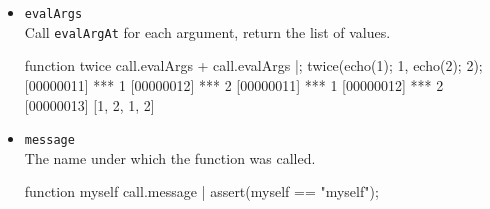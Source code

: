 \begin{itemize}
\item \lstinline|evalArgs|\\
  Call \lstinline|evalArgAt| for each argument, return the list of
  values.
\begin{urbiscript}[firstnumber=last]
function twice
{
  call.evalArgs + call.evalArgs
}|;
twice({echo(1); 1}, {echo(2); 2});
[00000011] *** 1
[00000012] *** 2
[00000011] *** 1
[00000012] *** 2
[00000013] [1, 2, 1, 2]
\end{urbiscript}

\item \lstinline|message|\\
  The name under which the function was called.
\begin{urbiscript}[firstnumber=last]
function myself { call.message }|
assert(myself == "myself");
\end{urbiscript}

\end{itemize}


